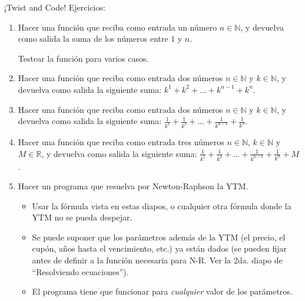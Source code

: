 \documentclass[handout,9pt]{beamer}
\begin{document}
\begin{frame}{¡Twist and Code! Ejercicios:}
	\begin{enumerate}
		\item Hacer una función que reciba como entrada un número $n\in\mathbb{N}$, y devuelva como salida la suma de los números entre $1$ y $n$.
		
		Testear la función para varios casos.
		
		\item Hacer una función que reciba como entrada dos números $n\in\mathbb{N}$ y $k\in\mathbb{N}$, y devuelva como salida la siguiente suma: $k^1 + k^2 + \dots +k^{n-1} + k^n$.

		\item Hacer una función que reciba como entrada dos números $n\in\mathbb{N}$ y $k\in\mathbb{N}$, y devuelva como salida la siguiente suma: $\frac{1}{k^1} + \frac{1}{k^2} + \dots +\frac{1}{k^{n-1}} + \frac{1}{k^n}$.

		\item Hacer una función que reciba como entrada tres números $n\in\mathbb{N}$, $k\in\mathbb{N}$ y $M\in\mathbb{R}$, y devuelva como salida la  siguiente suma: $\frac{1}{k^1} + \frac{1}{k^2} + \dots +\frac{1}{k^{n-1}} + \frac{1}{k^n} + M$.

		\item Hacer un programa que resuelva por Newton-Raphson la YTM.
		\begin{itemize}
			\item Usar la fórmula vista en estas diapos, o cualquier otra fórmula donde la YTM no se pueda despejar.
			\item Se puede suponer que los parámetros además de la YTM (el precio, el cupón, años hasta el vencimiento, etc.) ya están dados (se pueden fijar antes de definir a la función necesaria para N-R. Ver la 2da. diapo de ``Resolviendo ecuaciones'').
			\item El programa tiene que funcionar para \emph{cualquier} valor de los parámetros.
		\end{itemize}
		
		
	\end{enumerate}

\end{frame}
\end{document}

